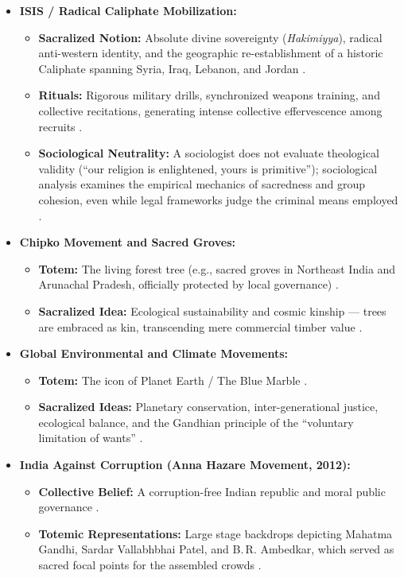 \begin{itemize}
    \item \textbf{ISIS / Radical Caliphate Mobilization:}
    \begin{itemize}
        \item \textbf{Sacralized Notion:} Absolute divine sovereignty (\textit{Hakimiyya}), radical anti-western identity, and the geographic re-establishment of a historic Caliphate spanning Syria, Iraq, Lebanon, and Jordan .
        \item \textbf{Rituals:} Rigorous military drills, synchronized weapons training, and collective recitations, generating intense collective effervescence among recruits .
        \item \textbf{Sociological Neutrality:} A sociologist does not evaluate theological validity (``our religion is enlightened, yours is primitive''); sociological analysis examines the empirical mechanics of sacredness and group cohesion, even while legal frameworks judge the criminal means employed .
    \end{itemize}
    
    \item \textbf{Chipko Movement and Sacred Groves:}
    \begin{itemize}
        \item \textbf{Totem:} The living forest tree (e.g., sacred groves in Northeast India and Arunachal Pradesh, officially protected by local governance) .
        \item \textbf{Sacralized Idea:} Ecological sustainability and cosmic kinship --- trees are embraced as kin, transcending mere commercial timber value .
    \end{itemize}

    \item \textbf{Global Environmental and Climate Movements:}
    \begin{itemize}
        \item \textbf{Totem:} The icon of Planet Earth / The Blue Marble .
        \item \textbf{Sacralized Ideas:} Planetary conservation, inter-generational justice, ecological balance, and the Gandhian principle of the ``voluntary limitation of wants'' .
    \end{itemize}

    \item \textbf{India Against Corruption (Anna Hazare Movement, 2012):}
    \begin{itemize}
        \item \textbf{Collective Belief:} A corruption-free Indian republic and moral public governance .
        \item \textbf{Totemic Representations:} Large stage backdrops depicting Mahatma Gandhi, Sardar Vallabhbhai Patel, and B.\,R. Ambedkar, which served as sacred focal points for the assembled crowds .
    \end{itemize}


\end{itemize}
